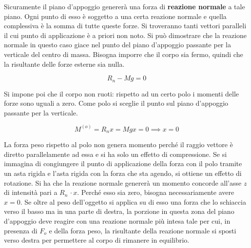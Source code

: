 \begin{figure}[htpb]
\end{figure}
\FloatBarrier
Sicuramente il piano d'appoggio genererà una forza di \textbf{reazione normale} a tale piano. Ogni punto di esso è soggetto a una certa reazione normale e quella complessiva è la somma di tutte queste forze. Si troveranno tanti vettori paralleli il cui punto di applicazione è a priori non noto. Si può dimostrare che la reazione normale in questo caso giace nel punto del piano d'appoggio passante per la verticale del centro di massa. Bisogna imporre che il corpo sia fermo, quindi che la risultante delle forze esterne sia nulla.

\[
	R_n-Mg=0
\]

Si impone poi che il corpo non ruoti: rispetto ad un certo polo i momenti delle forze sono uguali a zero. Come polo si sceglie il punto sul piano d'appoggio passante per la verticale.

\[
	M^{(o)} = R_n x = Mgx =0 \implies x=0
\]

La forza peso rispetto al polo non genera momento perché il raggio vettore è diretto parallelamente ad essa e si ha solo un effetto di compressione. Se si immagina di congiungere il punto di applicazione della forza con il polo tramite un asta rigida e l'asta rigida con la forza che sta agendo, si ottiene un effetto di rotazione. Si ha che la reazione normale genererà un momento concorde all'asse $z$ di intensità pari a $R_n\,\cdot x$.
Perché esso sia zero, bisogna necessariamente avere $x=0$. Se oltre al peso dell'oggetto si applica su di esso una forza che lo schiaccia verso il basso ma in una parte di destra, la porzione in questa zona del piano d'appoggio deve reagire con una reazione normale più intesa tale per cui, in presenza di $F_o$ e della forza peso, la risultante della reazione normale si sposti verso destra per permettere al corpo di rimanere in equilibrio.

